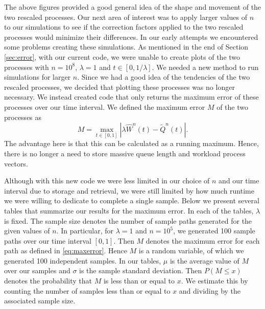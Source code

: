 \documentclass[12pt]{article}
\theoremstyle{plain}
\theoremstyle{definition}
\theoremstyle{remark}
\newcommand{\What}{\widehat{W}^{n}(t)}
\newcommand{\Qtild}{\widetilde{Q}^{n}(t)}
\begin{document}
The above figures provided a good general idea of the shape and movement of the two rescaled processes.
Our next area of interest was to apply larger values of $n$ to our simulations to see if the correction factors applied to the two rescaled processes would minimize their differences.
In our early attempts we encountered some problems creating these simulations.
As mentioned in the end of Section \ref{sec:error}, with our current code, we were unable to create plots of the two processes with $n=10^8$, $\lambda = 1$ and $t \in [0,1/\lambda]$.
We needed a new method to run simulations for larger $n$.
Since we had a good idea of the tendencies of the two rescaled processes, we decided that plotting these processes was no longer necessary. We instead created code that only returns the maximum error of these processes over our time interval.
We defined the maximum error $M$ of the two processes as
\begin{equation} \label{eq:maxerror}
M = \max_{t\in[0,1]} \left | \lambda \What - \Qtild \right |.
\end{equation}
The advantage here is that this can be calculated as a running maximum. Hence, there is no longer a need to store massive queue length and workload process vectors.

Although with this new code we were less limited in our choice of $n$ and our time interval due to storage and retrieval, we were still limited by how much runtime we were willing to dedicate to complete a single sample.
Below we present several tables that summarize our results for the maximum error. In each of the tables, $\lambda$ is fixed. The sample size denotes the number of sample paths generated for the given values of $n$. In particular, for $\lambda = 1$ and $n=10^5$, we generated 100 sample paths over our time interval $[0,1]$.
Then $M$ denotes the maximum error for each path as defined in \eqref{eq:maxerror}.
Hence $M$ is a random variable, of which we generated 100 independent samples. In our tables, $\mu$ is the average value of $M$ over our samples and $\sigma$ is the sample standard deviation. Then $P(M \leq x)$ denotes the probability that $M$ is less than or equal to $x$. We estimate this by counting the number of samples less than or equal to $x$ and dividing by the associated sample size.
\end{document}
